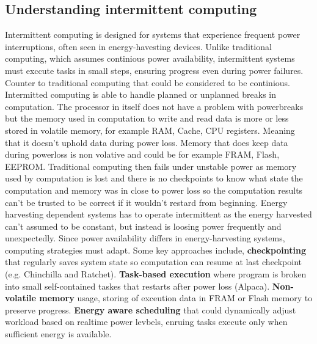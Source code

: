 \documentclass[article,a4paper]{IEEEtran}
\begin{document}
\subsection{Understanding intermittent computing}
Intermittent computing is designed for systems that experience frequent power interruptions, often seen in energy-havesting devices. Unlike traditional computing, which assumes continious power availability, intermittent systems must exccute tasks in small steps, ensuring progress even during power failures. 
Counter to traditional computing that could be considered to be continious. Intermitted computing is able to handle planned or unplanned breaks in computation. The processor in itself does not have a problem with powerbreaks but the memory used in computation to write and read data is more or less stored in volatile memory, for example RAM, Cache, CPU registers. Meaning that it doesn't uphold data during power loss. Memory that does keep data during powerloss is non volative and could be for example FRAM, Flash, EEPROM. Traditional computing then fails under unstable power as memory used by computation is lost and there is no checkpoints to know what state the computation and memory was in close to power loss so the computation results can't be trusted to be correct if it wouldn't restard from beginning. Energy harvesting dependent systems has to operate intermittent as the energy harvested can't assumed to be constant, but instead is loosing power frequently and unexpectedly. 
Since power availability differs in energy-harvesting systems, computing strategies must adapt. Some key approaches include, \textbf{checkpointing} that regularly saves system state so computation can resume at last checkpoint (e.g. Chinchilla and Ratchet). \textbf{Task-based execution} where program is broken into small self-contained taskes that restarts after power loss (Alpaca). \textbf{Non-volatile memory} usage, storing of exceution data in FRAM or Flash memory to preserve progress. \textbf{Energy aware scheduling} that could dynamically adjust workload based on realtime power levbels, enruing tasks execute only when sufficient energy is available. 
\end{document}
